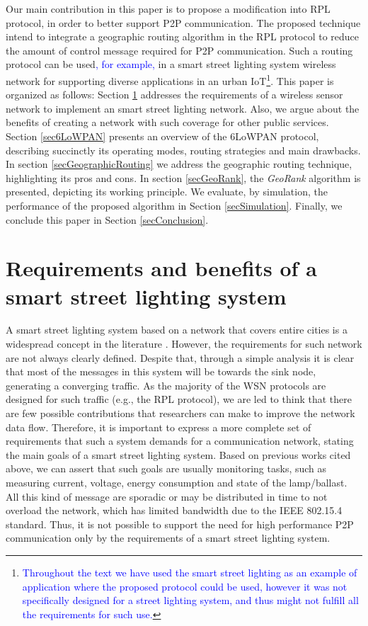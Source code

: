 \documentclass[final,authoryear,3p,twocolumn]{elsarticle}
\newcommand{\rev}{\textcolor{blue}}
\begin{document}
Our main contribution in this paper is to propose a modification into RPL protocol, in order to better support P2P communication. The proposed technique intend to integrate a geographic routing algorithm in the RPL protocol to reduce the amount of control message required for P2P communication. Such a routing protocol can be used\rev{, for example,} in a smart street lighting system wireless network for supporting diverse applications in an urban IoT\footnote{\rev{Throughout the text we have used the smart street lighting as an example of application where the proposed protocol could be used, however it was not specifically designed for a street lighting system, and thus might not fulfill all the requirements for such use.}}. This paper is organized as follows: Section \ref{secRequirements} addresses the requirements of a wireless sensor network to implement an smart street lighting network. Also, we argue about the benefits of creating a network with such coverage for other public services. Section \ref{sec6LoWPAN} presents an overview of the 6LoWPAN protocol, describing succinctly its operating modes, routing strategies and main drawbacks. In section \ref{secGeographicRouting} we address the geographic routing technique, highlighting its pros and cons. In section \ref{secGeoRank}, the \textit{GeoRank} algorithm is presented, depicting its working principle. We evaluate, by simulation, the performance of the proposed algorithm in Section \ref{secSimulation}. Finally, we conclude this paper in Section \ref{secConclusion}.


\section{Requirements and benefits of a smart street lighting system}
\label{secRequirements}
A smart street lighting system based on a network that covers entire cities is a widespread concept in the literature \citep{Cellular_Street_Lighting_2010_1, WSN_Street_Lighting_2010_1, Denardin2009, Pantoni_2011, daFonseca_2015}. However, the requirements for such network are not always clearly defined. Despite that, through a simple analysis it is clear that most of the messages in this system will be towards the sink node, generating a converging traffic. As the majority of the WSN protocols are designed for such traffic (e.g., the RPL protocol), we are led to think that there are few possible contributions that researchers can make to improve the network data flow. Therefore, it is important to express a more complete set of requirements that such a system demands for a communication network, stating the main goals of a smart street lighting system. Based on previous works cited above, we can assert that such goals are usually monitoring tasks, such as measuring current, voltage, energy consumption and state of the lamp/ballast. All this kind of message are sporadic or may be distributed in time to not overload the network, which has limited bandwidth due to the IEEE 802.15.4 standard. Thus, it is not possible to support the need for high performance P2P communication only by the requirements of a smart street lighting system.
\end{document}
